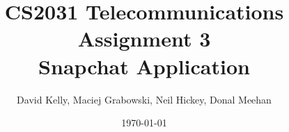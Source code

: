 \documentclass[11pt]{article}
\begin{document}
\begin{titlepage}
\title
{
CS2031 Telecommunications\\
Assignment 3\\
Snapchat Application
}
\author{David Kelly, Maciej Grabowski, Neil Hickey, Donal Meehan}
\date{\today}
\maketitle

\thispagestyle{empty}

\end{titlepage}

\tableofcontents

\thispagestyle{empty}

\pagebreak

\setcounter{page}{1}

\end{document}
